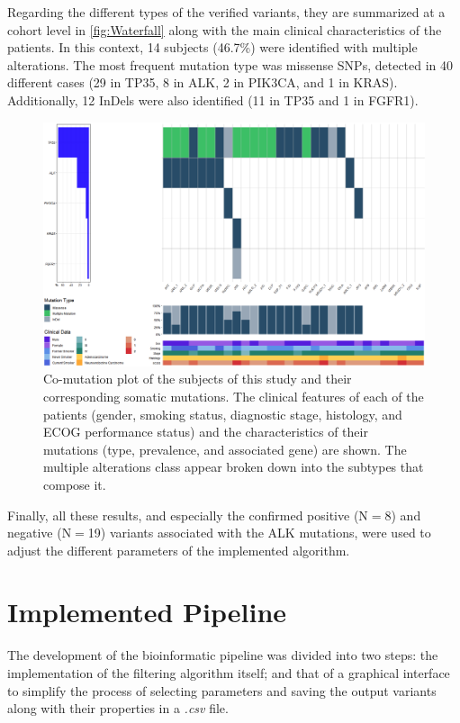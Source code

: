 Regarding the different types of the verified variants, they are summarized at a cohort level in \autoref{fig:Waterfall} along with the main clinical characteristics of the patients. In this context, 14 subjects (46.7\%) were identified with multiple alterations. The most frequent mutation type was missense SNPs, detected in 40 different cases (29 in TP35, 8 in ALK, 2 in PIK3CA, and 1 in KRAS). Additionally, 12 InDels were also identified (11 in TP35 and 1 in FGFR1).

\begin{figure}[ht]
    \centering
    \includegraphics[width=\textwidth]{Images/chapter_4/waterfall.png}
    \caption{Co-mutation plot of the subjects of this study and their corresponding somatic mutations. The clinical features of each of the patients (gender, smoking status, diagnostic stage, histology, and ECOG performance status) and the characteristics of their mutations (type, prevalence, and associated gene) are shown. The multiple alterations class appear broken down into the subtypes that compose it.}
    \label{fig:Waterfall}
\end{figure}

Finally, all these results, and especially the confirmed positive (N$=$8) and negative (N$=$19) variants associated with the ALK mutations, were used to adjust the different parameters of the implemented algorithm.

\section{Implemented Pipeline}

The development of the bioinformatic pipeline was divided into two steps: the implementation of the filtering algorithm itself; and that of a graphical interface to simplify the process of selecting parameters and saving the output variants along with their properties in a \textit{.csv} file.

